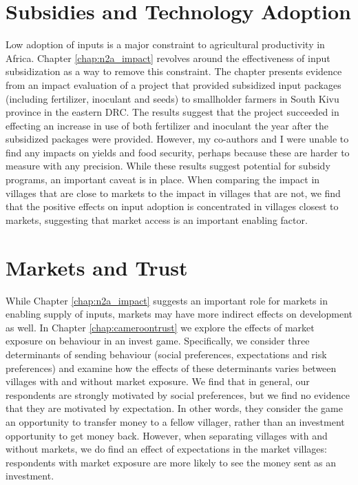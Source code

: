\section{Subsidies and Technology Adoption}
Low adoption of  inputs is a major constraint to agricultural productivity in Africa. Chapter \ref{chap:n2a_impact} revolves around the effectiveness of input subsidization as a way to remove this constraint. The chapter presents evidence from an impact evaluation of a project that provided subsidized input packages (including fertilizer, inoculant and seeds) to smallholder farmers in South Kivu province in the eastern DRC. The results suggest that the project succeeded in effecting an increase in use of both fertilizer and inoculant the year after the subsidized packages were provided. However, my co-authors and I were unable to find any impacts on yields and food security, perhaps because these are harder to measure with any precision. While these results suggest potential for subsidy programs, an important caveat is in place. When comparing the impact in villages that are close to markets to the impact in villages that are not, we find that the positive effects on input adoption is concentrated in villages closest to markets, suggesting that market access is an important enabling factor. 

\section{Markets and Trust}
While Chapter \ref{chap:n2a_impact} suggests an important role for markets in enabling supply of inputs, markets may have more indirect effects on development as well. In  Chapter \ref{chap:cameroontrust} we explore the effects of market exposure on behaviour in an invest game. Specifically, we consider three determinants of sending behaviour (social preferences, expectations and risk preferences) and examine how the effects of these determinants varies between villages with and without market exposure. We find that in general, our respondents are strongly motivated by social preferences, but we find no evidence that they are motivated by expectation. In other words, they consider the game an opportunity to transfer money to a fellow villager, rather than an investment opportunity to get money back. However, when separating villages with and without markets, we do find an effect of expectations in the market villages: respondents with market exposure are more likely to see the money sent as an investment.


